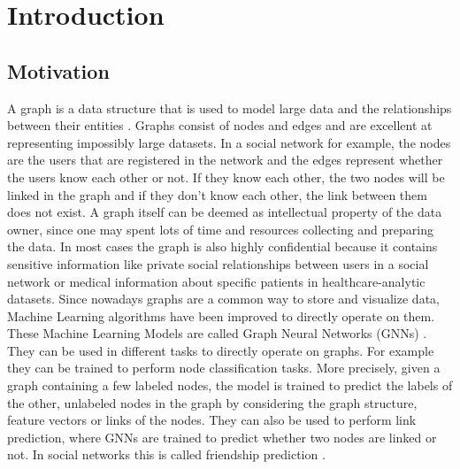 \chapter{Introduction}


	\section{Motivation}

		A graph is a data structure that is used to model large data and the relationships between their entities \cite{DBLP:journals/corr/abs-2005-00687, cook2006mining}.
		Graphs consist of nodes and edges and are excellent at representing impossibly large datasets.
		In a social network for example, the nodes are the users that are registered in the network and the edges represent whether the users know each other or not.
		If they know each other, the two nodes will be linked in the graph and if they don't know each other, the link between them does not exist.
		A graph itself can be deemed as intellectual property of the data owner, since one may spent lots of time and resources collecting and preparing the data.
		In most cases the graph is also highly confidential because it contains sensitive information like private social relationships between users in a social network or medical information about specific patients in healthcare-analytic datasets.
		Since nowadays graphs are a common way to store and visualize data, Machine Learning algorithms have been improved to directly operate on them.
		These Machine Learning Models are called Graph Neural Networks (GNNs) \cite{atwood2016diffusionconvolutional, defferrard2017convolutional}.
		They can be used in different tasks to directly operate on graphs.
		For example they can be trained to perform node classification tasks\cite{kipf2017semisupervised}.
		More precisely, given a graph containing a few labeled nodes, the model is trained to predict the labels of the other, unlabeled nodes in the graph by considering the graph structure, feature vectors or links of the nodes.
		They can also be used to perform link prediction, where GNNs are trained to predict whether two nodes are linked or not.
		In social networks this is called friendship prediction \cite{zhang2018link}.

